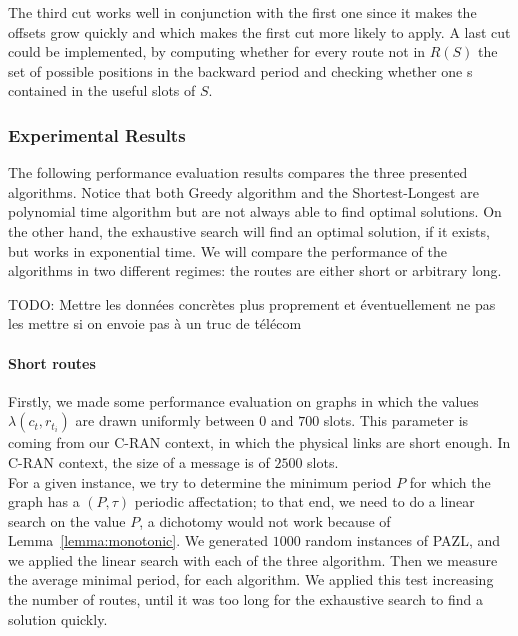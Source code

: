 \documentclass[a4paper,10pt]{article}
\newcommand{\todo}[1]{{\color{red} TODO: {#1}}}
\begin{document}
      The third cut works well in conjunction with the first one since it makes the offsets grow quickly and 
      which makes the first cut more likely to apply. A last cut could be implemented, by computing whether for every 
      route not in $R(S)$ the set of possible positions in the backward period and checking whether one s contained in the useful slots of $S$.


    \subsubsection{Experimental Results}\label{sec:experimental_results}
      
      The following performance evaluation results compares the three presented algorithms.
      Notice that both Greedy algorithm and the Shortest-Longest are polynomial time algorithm but are not always able to
      find optimal solutions. On the other hand, the exhaustive search will find an optimal solution, if it exists, but works in exponential time.
      We will compare the performance of the algorithms in two different regimes: the routes are either short or arbitrary long.
%             

      \todo{Mettre les données concrètes plus proprement et éventuellement ne pas les mettre si on envoie pas à un truc de télécom}

      \paragraph{Short routes}
      
      Firstly, we made some performance evaluation on graphs in which the values $\lambda(c_t,r_{t_i})$ are drawn uniformly between $0$ and $700$ slots. This parameter is coming from our C-RAN context, in which the physical links are short enough. In C-RAN context, the size of a message is of $2500$ slots.\\
      
      For a given instance, we try to determine the minimum period $P$ for which the graph has a $(P,\tau)$ periodic affectation; to that end,  we need to do a linear search on the value $P$, a dichotomy would not work because of Lemma~\ref{lemma:monotonic}.
      We generated $1000$ random instances of PAZL, and we applied the linear search with each of the three algorithm. Then we measure the average minimal period, for each algorithm. We applied this test increasing the number of routes, until it was too long for the exhaustive search to find a solution quickly.
\end{document}
